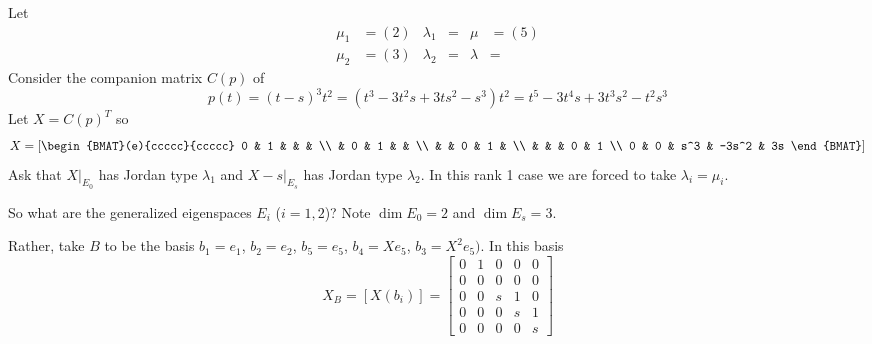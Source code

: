 \documentclass{article}
\begin{document}
\begin{example}
    Let 
    \[
    \begin{aligned}
        \mu_1 &= (2) & \lambda_1 &= & \mu &= (5) \\
        \mu_2 &= (3) & \lambda_2 &= & \lambda &= 
    \end{aligned}
    \]
    Consider the companion matrix $C(p)$ of 
    $$p(t) = (t-s)^3t^2 = (t^3 - 3t^2 s + 3t s^2 - s^3)t^2 = t^5 - 3 t^4 s + 3t^3 s^2 - t^2 s^3$$ 
    Let $X = C(p)^T$ so 
    \[
    X = \left[\begin{BMAT}(e){ccccc}{ccccc}
        0 & 1 & & & \\ 
        & 0 & 1 & & \\
        &   & 0 & 1 & \\ 
        &   &   & 0 & 1 \\
       0 & 0 & s^3 & -3s^2  & 3s  
    \end{BMAT}\right]    
    \]
    Ask that $X\big|_{E_0}$ has Jordan type $\lambda_1$ and $X-s\big|_{E_s}$ has Jordan type $\lambda_2$. In this rank 1 case we are forced to take $\lambda_i = \mu_i$. 
    
    So what are the generalized eigenspaces $E_i$ ($i = 1,2$)? Note $\dim E_0 = 2$ and $\dim E_s = 3$. 
    

    Rather, take $B$ to be the basis $b_1 = e_1$, $b_2 = e_2$, $b_5 = e_5$, $b_4 = Xe_5$, $b_3 = X^2e_5)$. In this basis
    \[
    X_B = [X(b_i)] = \begin{bmatrix}
        0 & 1 & 0 & 0 & 0 \\
        0 & 0 & 0 & 0 & 0 \\
        0 & 0 & s & 1 & 0 \\
        0 & 0 & 0 & s & 1 \\
        0 & 0 & 0 & 0 & s
    \end{bmatrix}
    \]

\end{example}
\end{document}
